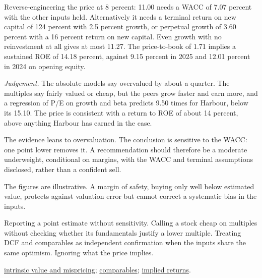 \begin{qfmethod}
Reverse-engineering the price at 8 percent: 11.00 needs a WACC of 7.07 percent with the other inputs held. Alternatively it needs a terminal return on new capital of 124 percent with 2.5 percent growth, or perpetual growth of 3.60 percent with a 16 percent return on new capital. Even growth with no reinvestment at all gives at most 11.27. The price-to-book of 1.71 implies a sustained ROE of 14.18 percent, against 9.15 percent in 2025 and 12.01 percent in 2024 on opening equity.

\emph{Judgement.} The absolute models say overvalued by about a quarter. The multiples say fairly valued or cheap, but the peers grow faster and earn more, and a regression of P/E on growth and beta predicts 9.50 times for Harbour, below its 15.10. The price is consistent with a return to ROE of about 14 percent, above anything Harbour has earned in the case.

The evidence leans to overvaluation. The conclusion is sensitive to the WACC: one point lower removes it. A recommendation should therefore be a moderate underweight, conditional on margins, with the WACC and terminal assumptions disclosed, rather than a confident sell.

 The figures are illustrative. A margin of safety, buying only well below estimated value, protects against valuation error but cannot correct a systematic bias in the inputs.

 Reporting a point estimate without sensitivity. Calling a stock cheap on multiples without checking whether its fundamentals justify a lower multiple. Treating DCF and comparables as independent confirmation when the inputs share the same optimism. Ignoring what the price implies.

 \hyperref[def:intrinsic-value-mispricing]{intrinsic value and mispricing}; \hyperref[meth:comparables-evaluation]{comparables}; \hyperref[meth:gordon-growth-model]{implied returns}.

\end{qfmethod}
